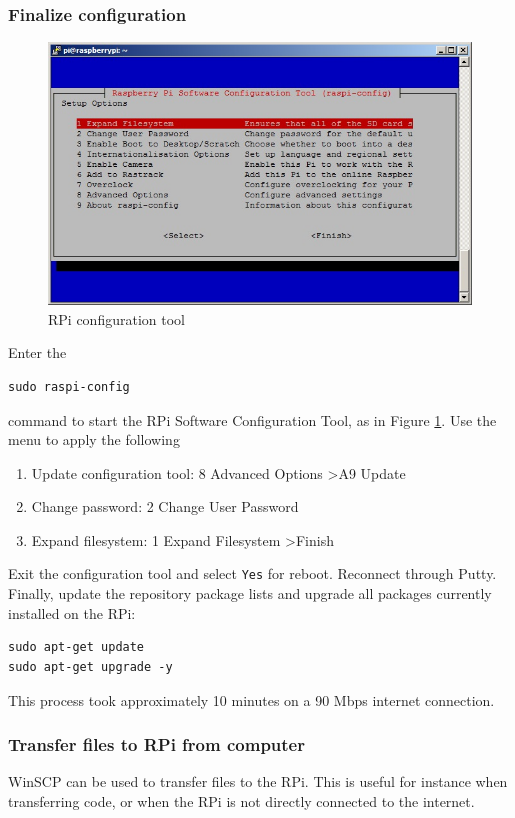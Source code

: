 \subsubsection{Finalize configuration}
\begin{figure}[htb!]
	\centering 
	\includegraphics[scale=0.45]{fig/Rpi_finalize_install} 
	\caption{RPi configuration tool}
	\label{fig: RPi configuration tool} 
\end{figure}
Enter the\begin{verbatim}sudo raspi-config\end{verbatim}command to start the RPi Software Configuration Tool, as in Figure \ref{fig: RPi configuration tool}. Use the menu to apply the following
\begin{enumerate}
	\item Update configuration tool: 8 Advanced Options \textgreater  A9 Update
	\item Change password: 2 Change User Password
	\item Expand filesystem: 1 Expand Filesystem \textgreater  Finish
\end{enumerate}
Exit the configuration tool and select \texttt{Yes} for reboot. Reconnect through Putty.
Finally, update the repository package lists and upgrade all packages currently installed on the RPi:\begin{verbatim}sudo apt-get update 
sudo apt-get upgrade -y\end{verbatim}This process took approximately 10 minutes on a 90 Mbps internet connection. 
\subsubsection{Transfer files to RPi from computer}\label{subsec: Transfer files to RPi}
WinSCP can be used to transfer files to the RPi. This is useful for instance when transferring code, or when the RPi is not directly connected to the internet.
